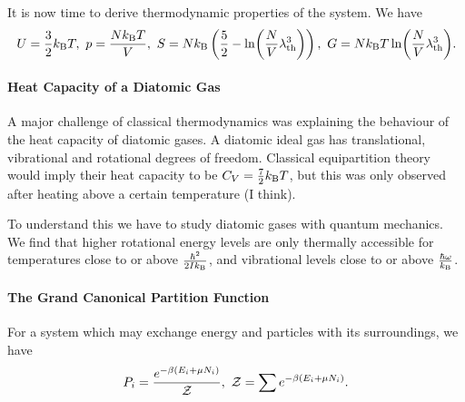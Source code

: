 It is now time to derive thermodynamic properties of the system. We have
\begin{align*}
	U = \frac{3}{2}\kb T,\ p = \frac{N\kb T}{V},\ S = N\kb\left(\frac{5}{2} - \ln(\frac{N}{V}\lambda_{\text{th}}^{3})\right),\ G = N\kb T\ln(\frac{N}{V}\lambda_{\text{th}}^{3}).
\end{align*}

\paragraph{Heat Capacity of a Diatomic Gas}
A major challenge of classical thermodynamics was explaining the behaviour of the heat capacity of diatomic gases. A diatomic ideal gas has translational, vibrational and rotational degrees of freedom. Classical equipartition theory would imply their heat capacity to be $C_{V} = \frac{7}{2}k_{\text{B}} T$, but this was only observed after heating above a certain temperature (I think).

To understand this we have to study diatomic gases with quantum mechanics. We find that higher rotational energy levels are only thermally accessible for temperatures close to or above $\frac{\hbar^{2}}{2Ik_{\text{B}}}$, and vibrational levels close to or above $\frac{\hbar\omega}{k_{\text{B}}}$.

\paragraph{The Grand Canonical Partition Function}
For a system which may exchange energy and particles with its surroundings, we have
\begin{align*}
	P_{i} = \frac{e^{-\beta(E_{i} + \mu N_{i})}}{\mathcal{Z}},\ \mathcal{Z} = \sum e^{-\beta(E_{i} + \mu N_{i})}.
\end{align*}

